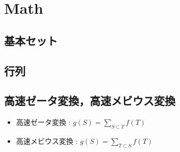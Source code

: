 \section{Math}

\subsection{基本セット}


\subsection{行列}



\subsection{高速ゼータ変換，高速メビウス変換}
\begin{itemize}
  \item 高速ゼータ変換 : $g(S) = \displaystyle\sum_{S \subset T} f(T)$
  \item 高速メビウス変換 : $g(S) = \displaystyle\sum_{T \subset S} f(T)$
\end{itemize}

